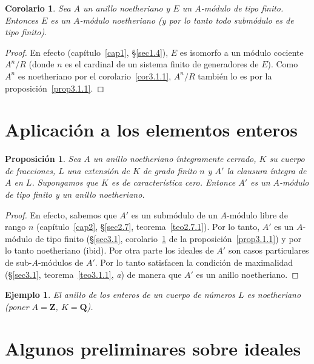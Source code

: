 \documentclass[oneside,bibtotoc,leqno,spanish]{amsbook}
\newcommand{\QQ}{\mathbf{Q}}
\newcommand{\ZZ}{\mathbf{Z}}
\numberwithin{equation}{section}
\theoremstyle{defi}
\theoremstyle{note}
\newtheorem{proposition}{Proposici\'on}
\newtheorem{corollary}{Corolario}
\theoremstyle{rem}
\newtheorem*{example*}{Ejemplo}
\numberwithin{theorem}{section}
\numberwithin{proposition}{section}
\numberwithin{definition}{section}
\numberwithin{lemma}{section}
\numberwithin{corollary}{section}
\numberwithin{example}{section}
\numberwithin{footnote}{section}%
\begin{document}
\begin{corollary}\label{cor3.1.2}
Sea $A$ un anillo noetheriano y $E$ un $A$-m\'odulo de tipo finito. Entonces $E$ es un
$A$-m\'odulo noetheriano {\upshape(}y por lo tanto todo subm\'odulo es de tipo finito{\upshape).}
\end{corollary}

\begin{proof}
En efecto (cap\'itulo~\ref{cap1}, \S\ref{sec1.4}), $E$ es isomorfo a un m\'odulo cociente $A^{n}/R$ (donde
$n$ es el cardinal de un sistema finito de generadores de $E$). Como $A^{n}$ es noetheriano
por el corolario~\ref{cor3.1.1}, $A^{n}/R$ tambi\'en lo es por la proposici\'on~\ref{prop3.1.1}.
\end{proof}

\section{Aplicaci\'on a los elementos enteros}\label{sec3.2}

\begin{proposition}
Sea $A$ un anillo noetheriano \'integramente cerrado, $K$ su cuerpo de fracciones,
$L$ una extensi\'on de $K$ de grado finito $n$ y $A'$ la clausura \'integra de $A$ en
$L$. Supongamos que $K$ es de caracter\'istica cero. Entonce $A'$ es un $A$-m\'odulo de tipo finito
y un anillo noetheriano.
\end{proposition}

\begin{proof}
En efecto, sabemos que $A'$ es un subm\'odulo de un $A$-m\'odulo libre de rango $n$
(cap\'itulo~\ref{cap2}, \S\ref{sec2.7}, teorema~\ref{teo2.7.1}). Por lo tanto, $A'$ es un $A$-m\'odulo de tipo finito
(\S\ref{sec3.1}, corolario~\ref{cor3.1.2} de la proposici\'on~\ref{prop3.1.1}) y por lo tanto noetheriano (ibid). Por otra parte los ideales
de $A'$ son casos particulares de sub-$A$-m\'odulos de $A'$. Por lo tanto satisfacen la condici\'on
de maximalidad (\S\ref{sec3.1}, teorema~\ref{teo3.1.1}, {\itshape a}) de manera que $A'$ es un anillo noetheriano.
\end{proof}

\begin{example*}
El anillo de los enteros de un cuerpo de n\'umeros $L$ es {\em noetheriano} (poner $A = \ZZ$,
$K = \QQ$).
\end{example*}

\section{Algunos preliminares sobre ideales}\label{sec3.3}
\end{document}
